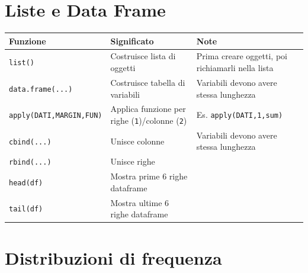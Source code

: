\documentclass[
  a4paper,
  DIV=11,
  numbers=noendperiod]{scrreprt}
\begin{document}
\section{Liste e Data Frame}\label{liste-e-data-frame}

\begin{longtable}[]{@{}
  >{\raggedright\arraybackslash}p{}
  >{\raggedright\arraybackslash}p{}
  >{\raggedright\arraybackslash}p{}@{}}
\toprule\noalign{}
\begin{minipage}[b]{\linewidth}\raggedright
Funzione
\end{minipage} & \begin{minipage}[b]{\linewidth}\raggedright
Significato
\end{minipage} & \begin{minipage}[b]{\linewidth}\raggedright
Note
\end{minipage} \\
\midrule\noalign{}
\endhead
\bottomrule\noalign{}
\endlastfoot
\texttt{list()} & Costruisce lista di oggetti & Prima creare oggetti,
poi richiamarli nella lista \\
\texttt{data.frame(...)} & Costruisce tabella di variabili & Variabili
devono avere stessa lunghezza \\
\texttt{apply(DATI,MARGIN,FUN)} & Applica funzione per righe
(\texttt{1})/colonne (\texttt{2}) & Es. \texttt{apply(DATI,1,sum)} \\
\texttt{cbind(...)} & Unisce colonne & Variabili devono avere stessa
lunghezza \\
\texttt{rbind(...)} & Unisce righe & \\
\texttt{head(df)} & Mostra prime 6 righe dataframe & \\
\texttt{tail(df)} & Mostra ultime 6 righe dataframe & \\
\end{longtable}

\section{Distribuzioni di frequenza}\label{distribuzioni-di-frequenza}
\end{document}
